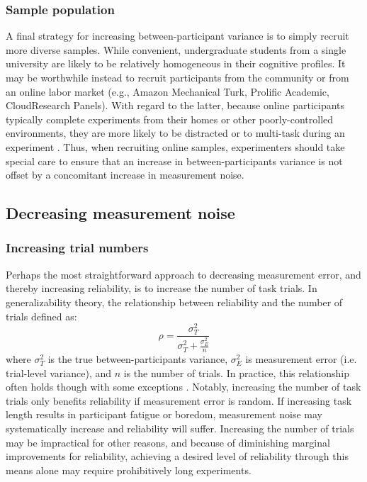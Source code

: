 \documentclass[a4paper,12pt]{article}
\begin{document}
\subsubsection{Sample population}

A final strategy for increasing between-participant variance is to simply recruit more diverse samples. While convenient, undergraduate students from a single university are likely to be relatively homogeneous in their cognitive profiles. It may be worthwhile instead to recruit participants from the community or from an online labor market (e.g., Amazon Mechanical Turk, Prolific Academic, CloudResearch Panels). With regard to the latter, because online participants typically complete experiments from their homes or other poorly-controlled environments, they are more likely to be distracted or to multi-task during an experiment \cite{newman2021data}. Thus, when recruiting online samples, experimenters should take special care to ensure that an increase in between-participants variance is not offset by a concomitant increase in measurement noise.

\subsection{Decreasing measurement noise}

\subsubsection{Increasing trial numbers}

Perhaps the most straightforward approach to decreasing measurement error, and thereby increasing reliability, is to increase the number of task trials. In generalizability theory, the relationship between reliability and the number of trials defined as:
\begin{equation}
    \rho = \frac{\sigma^2_T}{\sigma^2_T + \frac{\sigma^2_E}{n}}
\end{equation}
where $\sigma^2_T$ is the true between-participants variance, $\sigma^2_E$ is measurement error (i.e. trial-level variance), and $n$ is the number of trials. In practice, this relationship often holds \cite{paap2016role, cooper2017role} though with some exceptions \cite{price2015empirical, klingelhoefer2022robust}. Notably, increasing the number of task trials only benefits reliability if measurement error is random. If increasing task length results in participant fatigue or boredom, measurement noise may systematically increase and reliability will suffer. Increasing the number of trials may be impractical for other reasons, and because of diminishing marginal improvements for reliability, achieving a desired level of reliability through this means alone may require prohibitively long experiments.
\end{document}
